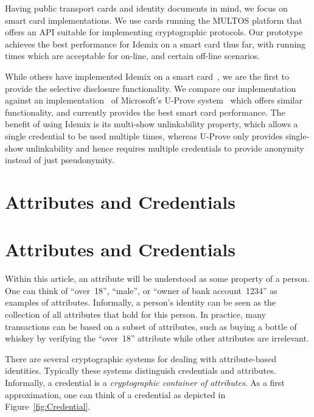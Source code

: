 Having public transport cards and identity documents in mind, we focus on smart
card implementations. We use cards running the MULTOS platform that offers an
API suitable for implementing cryptographic protocols. Our prototype achieves
the best performance for Idemix on a smart card thus far, with running times
which are acceptable for on-line, and certain off-line scenarios.

While others have implemented Idemix on a smart
card~\cite{BichselCGS2009,Sterckx09}, we are the first to provide the selective
disclosure functionality. We compare our implementation against an
implementation~\cite{MostowskiVullers11} of Microsoft's U-Prove
system~\cite{Brands2000,U-Prove_Crypto2011} which offers similar functionality,
and currently provides the best smart card performance. The benefit of using
Idemix is its multi-show unlinkability property, which allows a single
credential to be used multiple times, whereas U-Prove only provides single-show
unlinkability and hence requires multiple credentials to provide anonymity
instead of just pseudonymity.


\section{Attributes and Credentials}

\section{Attributes and Credentials}\label{sec:Intro2Attributes}

Within this article, an attribute will be understood as some property of a
person. One can think of ``over~18'', ``male'', or ``owner of bank
account~1234'' as examples of attributes. Informally, a person's identity can be
seen as the collection of all attributes that hold for this person. In practice,
many transactions can be based on a subset of attributes, such as buying a
bottle of whiskey by verifying the ``over~18'' attribute while other attributes
are irrelevant.

There are several cryptographic systems for dealing with attribute-based
identities. Typically these systems distinguish credentials and attributes.
Informally, a credential is a \emph{cryptographic container of attributes}. As
a first approximation, one can think of a credential as depicted in
Figure~\ref{fig:Credential}.

